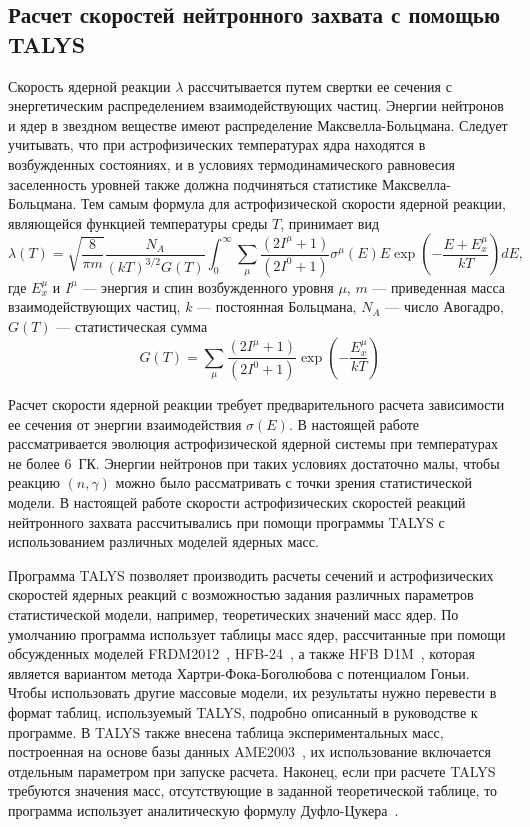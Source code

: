 \subsection{Расчет скоростей нейтронного захвата с помощью TALYS}
Скорость ядерной реакции $\lambda$ рассчитывается путем свертки ее сечения с энергетическим распределением взаимодействующих частиц. Энергии нейтронов и ядер в звездном веществе имеют распределение Максвелла-Больцмана. Следует учитывать, что при астрофизических температурах ядра находятся в возбужденных состояниях, и в условиях термодинамического равновесия заселенность уровней также должна подчиняться статистике Максвелла-Больцмана. Тем самым формула для астрофизической скорости ядерной реакции, являющейся функцией температуры среды $T$, принимает вид
\begin{equation}
\displaystyle
\lambda(T) = \sqrt{\frac{8}{\pi m}} \frac{N_A}{(k T)^{3/2} G(T)} \int_0^\infty \sum_\mu \frac{(2 I^\mu + 1)}{(2 I^0 + 1)} \sigma^\mu(E) E \exp \left( - \frac{E + E_x^\mu}{kT} \right) dE,
\end{equation}
где $E^\mu_x$ и $I^\mu$ --- энергия и спин возбужденного уровня $\mu$, $m$ --- приведенная масса взаимодействующих частиц, $k$ --- постоянная Больцмана, $N_A$ --- число Авогадро, $G(T)$ --- статистическая сумма
\begin{equation}
    \displaystyle
    G(T) = \sum_\mu \frac{(2 I^\mu + 1)}{(2 I^0 + 1)} \exp \left( - \frac{E_x^\mu}{kT} \right)
\end{equation}

Расчет скорости ядерной реакции требует предварительного расчета зависимости ее сечения от энергии взаимодействия $\sigma(E)$. В настоящей работе рассматривается эволюция астрофизической ядерной системы при температурах не более $6$~ГК. Энергии нейтронов при таких условиях достаточно малы, чтобы реакцию $(n,\gamma)$ можно было рассматривать с точки зрения статистической модели. В настоящей работе скорости астрофизических скоростей реакций нейтронного захвата рассчитывались при помощи программы TALYS с использованием различных моделей ядерных масс. 

Программа TALYS позволяет производить расчеты сечений и астрофизических скоростей ядерных реакций с возможностью задания различных параметров статистической модели, например, теоретических значений масс ядер. По умолчанию программа использует таблицы масс ядер, рассчитанные при помощи обсужденных моделей FRDM2012~\cite{moller2016}, HFB-24~\cite{goriely2013}, а также HFB D1M~\cite{goriely2009}, которая является вариантом метода Хартри-Фока-Боголюбова с потенциалом Гоньи. Чтобы использовать другие массовые модели, их результаты нужно перевести в формат таблиц, используемый TALYS, подробно описанный в руководстве к программе. В TALYS также внесена таблица экспериментальных масс, построенная на основе базы данных AME2003~\cite{wapstra2003}, их использование включается отдельным параметром при запуске расчета. Наконец, если при расчете TALYS требуются значения масс, отсутствующие в заданной теоретической таблице, то программа использует аналитическую формулу Дуфло-Цукера~\cite{duflo1995}.

